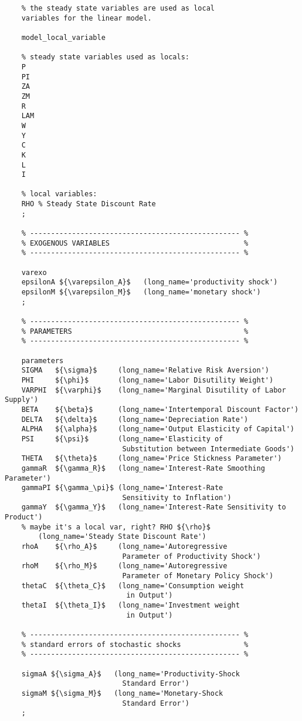 \documentclass[
	12pt, 
	]{article}
\numberwithin{equation}{section}
\theoremstyle{definition}
\theoremstyle{plain}
\theoremstyle{plain}
\theoremstyle{plain}
\begin{document}
\begin{verbatim}
	% the steady state variables are used as local 
	variables for the linear model.
	
	model_local_variable
	
	% steady state variables used as locals:
	P
	PI
	ZA
	ZM
	R
	LAM
	W
	Y
	C
	K
	L
	I
	
	% local variables:
	RHO % Steady State Discount Rate
	;
	
	% -------------------------------------------------- %
	% EXOGENOUS VARIABLES                                %
	% -------------------------------------------------- %
	
	varexo
	epsilonA ${\varepsilon_A}$   (long_name='productivity shock')
	epsilonM ${\varepsilon_M}$   (long_name='monetary shock')
	;
	
	% -------------------------------------------------- %
	% PARAMETERS                                         %
	% -------------------------------------------------- %
	
	parameters
	SIGMA   ${\sigma}$     (long_name='Relative Risk Aversion')
	PHI     ${\phi}$       (long_name='Labor Disutility Weight')  
	VARPHI  ${\varphi}$    (long_name='Marginal Disutility of Labor Supply')
	BETA    ${\beta}$      (long_name='Intertemporal Discount Factor')
	DELTA   ${\delta}$     (long_name='Depreciation Rate')
	ALPHA   ${\alpha}$     (long_name='Output Elasticity of Capital')
	PSI     ${\psi}$       (long_name='Elasticity of 
	                        Substitution between Intermediate Goods')
	THETA   ${\theta}$     (long_name='Price Stickness Parameter')
	gammaR  ${\gamma_R}$   (long_name='Interest-Rate Smoothing Parameter')
	gammaPI ${\gamma_\pi}$ (long_name='Interest-Rate 
	                        Sensitivity to Inflation')
	gammaY  ${\gamma_Y}$   (long_name='Interest-Rate Sensitivity to Product')
	% maybe it's a local var, right? RHO ${\rho}$ 
		(long_name='Steady State Discount Rate')
	rhoA    ${\rho_A}$     (long_name='Autoregressive 
	                        Parameter of Productivity Shock')
	rhoM    ${\rho_M}$     (long_name='Autoregressive 
	                        Parameter of Monetary Policy Shock')
	thetaC  ${\theta_C}$   (long_name='Consumption weight 
	                         in Output')
	thetaI  ${\theta_I}$   (long_name='Investment weight 
	                         in Output')
	
	% -------------------------------------------------- % 
	% standard errors of stochastic shocks               %
	% -------------------------------------------------- %
	
	sigmaA ${\sigma_A}$   (long_name='Productivity-Shock 
	                        Standard Error')
	sigmaM ${\sigma_M}$   (long_name='Monetary-Shock 
	                        Standard Error')
	;
	

\end{verbatim}
\end{document}
